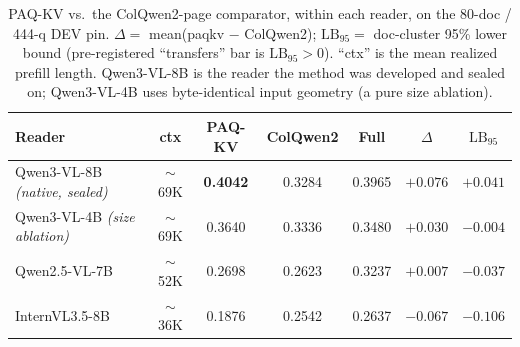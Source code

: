 \documentclass[letterpaper]{article} %
\newcommand{\paqc}{\textsc{PAQ-KV}}
\newcommand{\lb}{\mathrm{LB}_{95}}
\begin{document}
\begin{table}[t]
\centering
\caption{\paqc{} vs.\ the ColQwen2-page comparator, within each reader, on the 80-doc / 444-q DEV pin.
$\Delta=$ mean(paqkv $-$ ColQwen2); $\lb=$ doc-cluster 95\% lower bound (pre-registered ``transfers'' bar is
$\lb>0$). ``ctx'' is the mean realized prefill length. Qwen3-VL-8B is the reader the method was developed and
sealed on; Qwen3-VL-4B uses byte-identical input geometry (a pure size ablation).}
\label{tab:main}
\small
\begin{tabular}{@{}lcccccc@{}}
\toprule
Reader & ctx & \paqc{} & ColQwen2 & Full & $\Delta$ & $\lb$ \\
\midrule
Qwen3-VL-8B \textit{(native, sealed)}   & $\sim$69K & \textbf{0.4042} & 0.3284 & 0.3965 & $+0.076$ & $+0.041$ \\
Qwen3-VL-4B \textit{(size ablation)}    & $\sim$69K & 0.3640 & 0.3336 & 0.3480 & $+0.030$ & $-0.004$ \\
Qwen2.5-VL-7B                           & $\sim$52K & 0.2698 & 0.2623 & 0.3237 & $+0.007$ & $-0.037$ \\
InternVL3.5-8B                          & $\sim$36K & 0.1876 & 0.2542 & 0.2637 & $-0.067$ & $-0.106$ \\
\bottomrule
\end{tabular}
\end{table}
\end{document}
